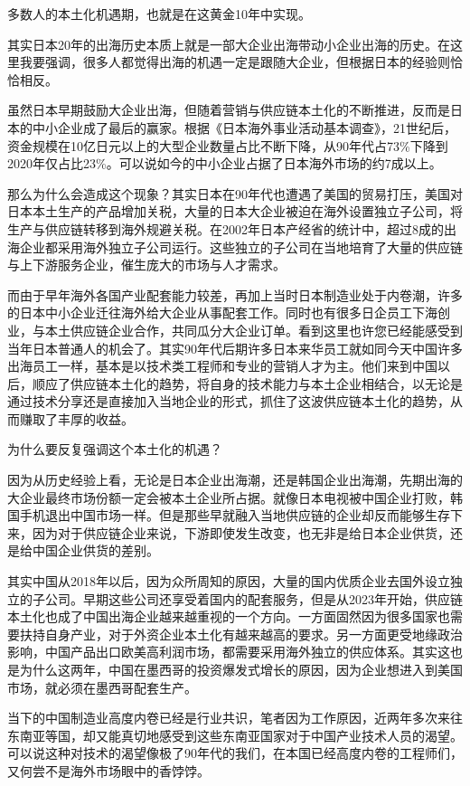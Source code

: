 多数人的本土化机遇期，也就是在这黄金10年中实现。

其实日本20年的出海历史本质上就是一部大企业出海带动小企业出海的历史。在这里我要强调，很多人都觉得出海的机遇一定是跟随大企业，但根据日本的经验则恰恰相反。

虽然日本早期鼓励大企业出海，但随着营销与供应链本土化的不断推进，反而是日本的中小企业成了最后的赢家。根据《日本海外事业活动基本调查》，21世纪后，资金规模在10亿日元以上的大型企业数量占比不断下降，从90年代占73\%下降到2020年仅占比23\%。可以说如今的中小企业占据了日本海外市场的约7成以上。

那么为什么会造成这个现象？其实日本在90年代也遭遇了美国的贸易打压，美国对日本本土生产的产品增加关税，大量的日本大企业被迫在海外设置独立子公司，将生产与供应链转移到海外规避关税。在2002年日本产经省的统计中，超过8成的出海企业都采用海外独立子公司运行。这些独立的子公司在当地培育了大量的供应链与上下游服务企业，催生庞大的市场与人才需求。

而由于早年海外各国产业配套能力较差，再加上当时日本制造业处于内卷潮，许多的日本中小企业迁往海外给大企业从事配套工作。同时也有很多日企员工下海创业，与本土供应链企业合作，共同瓜分大企业订单。看到这里也许您已经能感受到当年日本普通人的机会了。其实90年代后期许多日本来华员工就如同今天中国许多出海员工一样，基本是以技术类工程师和专业的营销人才为主。他们来到中国以后，顺应了供应链本土化的趋势，将自身的技术能力与本土企业相结合，以无论是通过技术分享还是直接加入当地企业的形式，抓住了这波供应链本土化的趋势，从而赚取了丰厚的收益。

为什么要反复强调这个本土化的机遇？

因为从历史经验上看，无论是日本企业出海潮，还是韩国企业出海潮，先期出海的大企业最终市场份额一定会被本土企业所占据。就像日本电视被中国企业打败，韩国手机退出中国市场一样。但是那些早就融入当地供应链的企业却反而能够生存下来，因为对于供应链企业来说，下游即使发生改变，也无非是给日本企业供货，还是给中国企业供货的差别。

其实中国从2018年以后，因为众所周知的原因，大量的国内优质企业去国外设立独立的子公司。早期这些公司还享受着国内的配套服务，但是从2023年开始，供应链本土化也成了中国出海企业越来越重视的一个方向。一方面固然因为很多国家也需要扶持自身产业，对于外资企业本土化有越来越高的要求。另一方面更受地缘政治影响，中国产品出口欧美高利润市场，都需要采用海外独立的供应体系。其实这也是为什么这两年，中国在墨西哥的投资爆发式增长的原因，因为企业想进入到美国市场，就必须在墨西哥配套生产。

当下的中国制造业高度内卷已经是行业共识，笔者因为工作原因，近两年多次来往东南亚等国，却又能真切地感受到这些东南亚国家对于中国产业技术人员的渴望。可以说这种对技术的渴望像极了90年代的我们，在本国已经高度内卷的工程师们，又何尝不是海外市场眼中的香饽饽。

